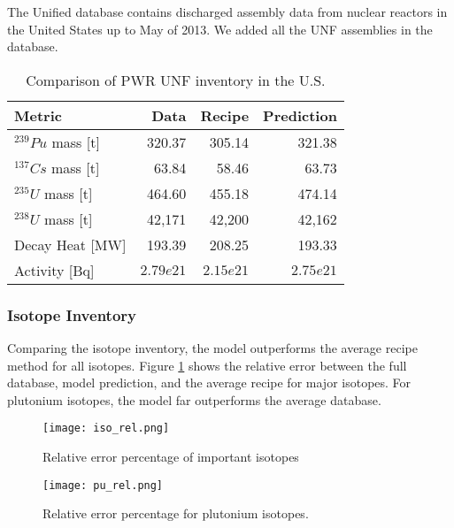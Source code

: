 The Unified database contains discharged assembly data
from nuclear reactors in the United States up to May of
2013. We added all the \gls{UNF} assemblies in the database.


\begin{table}[h]
    \centering
    \begin{tabular}{l|r|rr}
        \hline
        Metric & Data & Recipe & Prediction \\
        \hline
        $^{239}Pu$ mass [t] & 320.37 & 305.14 & 321.38\\
        $^{137}Cs$ mass [t] & 63.84 & 58.46 & 63.73 \\
        $^{235}U$ mass [t] & 464.60 & 455.18 & 474.14\\
        $^{238}U$ mass [t] & 42,171 & 42,200 & 42,162\\
        \hline
        Decay Heat [MW] & 193.39 & 208.25 & 193.33 \\
        Activity [Bq] & $2.79e21$ & $2.15e21$ & $2.75e21$ \\
        \hline
    \end{tabular}
    \caption{Comparison of \gls{PWR} \gls{UNF} inventory in the U.S.}
\end{table}

\FloatBarrier

\subsubsection{Isotope Inventory}

Comparing the isotope inventory, the model outperforms the
average recipe method for all isotopes.
Figure \ref{fig:iso_rel} shows the relative
error between the full database, model prediction, and
the average recipe for
major isotopes. For plutonium isotopes, the model far
outperforms the average database.

\begin{figure}
    \centering
    \texttt{[image: iso\_rel.png]}
    \caption{Relative error percentage of important isotopes}
    \label{fig:iso_rel}
\end{figure}


\begin{figure}
    \centering
    \texttt{[image: pu\_rel.png]}
    \caption{Relative error percentage for plutonium isotopes.}
    \label{fig:pu_rel}
\end{figure}

\FloatBarrier


